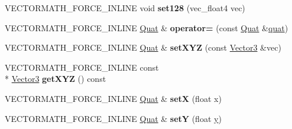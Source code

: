 \begin{DoxyCompactItemize}
\item 
\hypertarget{class_vectormath_1_1_aos_1_1_quat_a40df4361da2c782091f24749349812f7}{V\+E\+C\+T\+O\+R\+M\+A\+T\+H\+\_\+\+F\+O\+R\+C\+E\+\_\+\+I\+N\+L\+I\+N\+E void {\bfseries set128} (vec\+\_\+float4 vec)}\label{class_vectormath_1_1_aos_1_1_quat_a40df4361da2c782091f24749349812f7}

\item 
\hypertarget{class_vectormath_1_1_aos_1_1_quat_a60c4c39e0aab60957f341978df7ef64e}{V\+E\+C\+T\+O\+R\+M\+A\+T\+H\+\_\+\+F\+O\+R\+C\+E\+\_\+\+I\+N\+L\+I\+N\+E \hyperlink{class_vectormath_1_1_aos_1_1_quat}{Quat} \& {\bfseries operator=} (const \hyperlink{class_vectormath_1_1_aos_1_1_quat}{Quat} \&\hyperlink{classquat}{quat})}\label{class_vectormath_1_1_aos_1_1_quat_a60c4c39e0aab60957f341978df7ef64e}

\item 
\hypertarget{class_vectormath_1_1_aos_1_1_quat_a9bc1efa2dcf5094f5e887d618c578340}{V\+E\+C\+T\+O\+R\+M\+A\+T\+H\+\_\+\+F\+O\+R\+C\+E\+\_\+\+I\+N\+L\+I\+N\+E \hyperlink{class_vectormath_1_1_aos_1_1_quat}{Quat} \& {\bfseries set\+X\+Y\+Z} (const \hyperlink{class_vectormath_1_1_aos_1_1_vector3}{Vector3} \&vec)}\label{class_vectormath_1_1_aos_1_1_quat_a9bc1efa2dcf5094f5e887d618c578340}

\item 
\hypertarget{class_vectormath_1_1_aos_1_1_quat_ab8d6cca5b278b8b4b9ffc45818776814}{V\+E\+C\+T\+O\+R\+M\+A\+T\+H\+\_\+\+F\+O\+R\+C\+E\+\_\+\+I\+N\+L\+I\+N\+E const \\*
\hyperlink{class_vectormath_1_1_aos_1_1_vector3}{Vector3} {\bfseries get\+X\+Y\+Z} () const }\label{class_vectormath_1_1_aos_1_1_quat_ab8d6cca5b278b8b4b9ffc45818776814}

\item 
\hypertarget{class_vectormath_1_1_aos_1_1_quat_aa81055791b8260434535fbdad4c893c2}{V\+E\+C\+T\+O\+R\+M\+A\+T\+H\+\_\+\+F\+O\+R\+C\+E\+\_\+\+I\+N\+L\+I\+N\+E \hyperlink{class_vectormath_1_1_aos_1_1_quat}{Quat} \& {\bfseries set\+X} (float x)}\label{class_vectormath_1_1_aos_1_1_quat_aa81055791b8260434535fbdad4c893c2}

\item 
\hypertarget{class_vectormath_1_1_aos_1_1_quat_a04649b4fc35e945951a10513f6442b71}{V\+E\+C\+T\+O\+R\+M\+A\+T\+H\+\_\+\+F\+O\+R\+C\+E\+\_\+\+I\+N\+L\+I\+N\+E \hyperlink{class_vectormath_1_1_aos_1_1_quat}{Quat} \& {\bfseries set\+Y} (float \hyperlink{_ice_utils_8h_aa7ffaed69623192258fb8679569ff9ba}{y})}\label{class_vectormath_1_1_aos_1_1_quat_a04649b4fc35e945951a10513f6442b71}


\end{DoxyCompactItemize}
